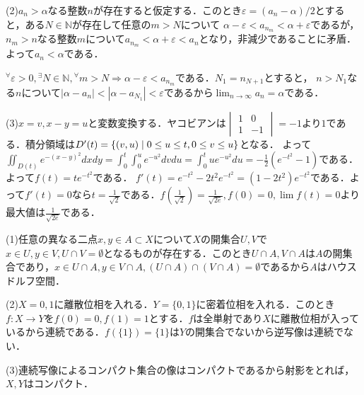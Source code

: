 \documentclass[
		book,
		head_space=20mm,
		foot_space=20mm,
		gutter=10mm,
		line_length=190mm
]{jlreq}
\begin{document}
(2)$a_n >\alpha$なる整数$n$が存在すると仮定する．このとき$\varepsilon=(a_n-\alpha)/2$とすると，ある$N\in \mathbb{N}$が存在して任意の$m>N$について
$\alpha-\varepsilon<a_{n_m}<\alpha+\varepsilon$であるが，$n_m>n$なる整数$m$について$a_{n_m}<\alpha+\varepsilon<a_n$となり，非減少であることに矛盾．よって$a_n < \alpha$である．

${}^{\forall}\varepsilon>0,{}^{\exists}N \in \mathbb{N},{}^{\forall}m>N \Rightarrow \alpha-\varepsilon<a_{n_m}$である．$N_1=n_{N+1}$とすると，
$n > N_1$なる$n$について$|\alpha-a_n|<|\alpha-a_{N_1}|<\varepsilon$であるから$\lim_{n \to \infty}a_n=\alpha$である．

(3)$x=v,x-y=u$と変数変換する．ヤコビアンは$\begin{vmatrix}
	1 & 0 \\
	1 & -1
\end{vmatrix}=-1$より$1$である．積分領域は$D'(t)=\left\{ (v,u)\mathrel{}\middle|\mathrel{} 0\le u\le t,0\le v\le u\right\}$となる．
よって$\iint_{D(t)}e^{-(x-y)^2}dxdy=\int_0^t \int_0^u e^{-u^2}dvdu=\int_0^t ue^{-u^2}du=-\frac{1}{2}(e^{-t^2}-1)$である．よって$f(t)=te^{-t^2}$である．
$f'(t)=e^{-t^2}-2t^2e^{-t^2}=(1-2t^2)e^{-t^2}$である．よって$f'(t)=0$なら$t=\frac{1}{\sqrt{2}}$である．$f(\frac{1}{\sqrt{2}})=\frac{1}{\sqrt{2e}},f(0)=0,\lim f(t)=0$より最大値は$\frac{1}{\sqrt{2e}}$である．


(1)任意の異なる二点$x,y \in A\subset X$について$X$の開集合$U,V$で$x \in U , y\in V ,U \cap V=\emptyset$となるものが存在する．このとき$U\cap A,V\cap A$は$A$の開集合であり，$x \in U\cap A , y\in V\cap A ,(U\cap A) \cap (V\cap A)=\emptyset$であるから$A$はハウスドルフ空間．

(2)$X={ 0,1}$に離散位相を入れる．$Y=\{ 0,1\}$に密着位相を入れる．このとき$f\colon X \rightarrow Y$を$f(0)=0,f(1)=1$とする．$f$は全単射であり$X$に離散位相が入っているから連続である．$f(\{1\})=\{1\}$は$Y$の開集合でないから逆写像は連続でない．

(3)連続写像によるコンパクト集合の像はコンパクトであるから射影をとれば，$X,Y$はコンパクト．
\end{document}
